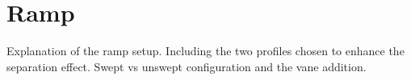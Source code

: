 \section{Ramp}
Explanation of the ramp setup. Including the two profiles chosen to enhance the separation effect. Swept vs unswept configuration and the vane addition.



